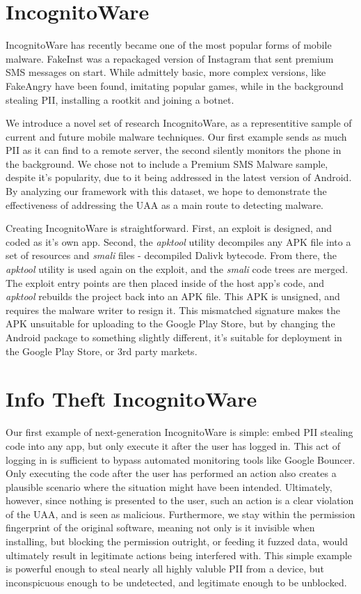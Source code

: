 \section{IncognitoWare}
IncognitoWare has recently became one of the most popular forms of mobile malware\citep{nq2013}. FakeInst\citep{avastfakeinst} was a repackaged version of Instagram\citep{instagramandroid} that sent premium SMS messages on start. While admittely basic, more complex versions, like FakeAngry\citep{fakeangry} have been found, imitating popular games, while in the background stealing PII, installing a rootkit and joining a botnet.

We introduce a novel set of research IncognitoWare, as a representitive sample of current and future mobile malware techniques. Our first example sends as much PII as it can find to a remote server, the second silently monitors the phone in the background. We chose not to include a Premium SMS Malware sample, despite it's popularity\citep{nq2013}, due to it being addressed in the latest version of Android. By analyzing our framework with this dataset, we hope to demonstrate the effectiveness of addressing the UAA as a main route to detecting malware.

Creating IncognitoWare is straightforward. First, an exploit is designed, and coded as it's own app. Second, the \textit{apktool}\citep{apktool} utility decompiles any APK file into a set of resources and \textit{smali} files - decompiled Dalivk bytecode. From there, the \textit{apktool} utility is used again on the exploit, and the \textit{smali} code trees are merged. The exploit entry points are then placed inside of the host app's code, and \textit{apktool} rebuilds the project back into an APK file. This APK is unsigned, and requires the malware writer to resign it. This mismatched signature makes the APK unsuitable for uploading to the Google Play Store, but by changing the Android package to something slightly different, it's suitable for deployment in the Google Play Store, or 3rd party markets.


\section{Info Theft IncognitoWare}
Our first example of next-generation IncognitoWare is simple: embed PII stealing code into any app, but only execute it after the user has logged in. This act of logging in is sufficient to bypass automated monitoring tools like Google Bouncer. Only executing the code after the user has performed an action also creates a plausible scenario where the situation might have been intended. Ultimately, however, since nothing is presented to the user, such an action is a clear violation of the UAA, and is seen as malicious. Furthermore, we stay within the permission fingerprint of the original software, meaning not only is it invisible when installing, but blocking the permission outright, or feeding it fuzzed data, would ultimately result in legitimate actions being interfered with. This simple example is powerful enough to steal nearly all highly valuble PII from a device, but inconspicuous enough to be undetected, and legitimate enough to be unblocked.

